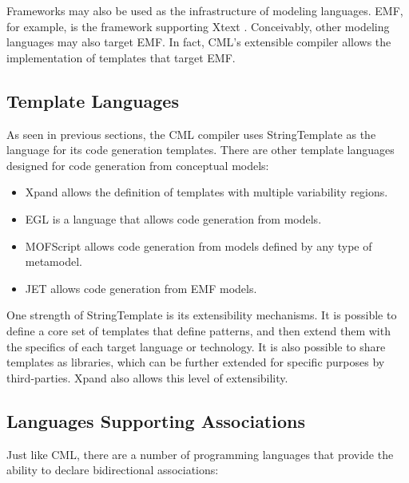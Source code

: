 Frameworks may also be used as the infrastructure of modeling languages.
EMF, for example, is the framework supporting Xtext \cite{xtext}.
Conceivably, other modeling languages may also target EMF.
In fact, CML's extensible compiler allows the implementation of templates that target EMF.

\subsection{Template Languages}

As seen in previous sections,
the CML compiler uses StringTemplate as the language for its code generation templates.
There are other template languages designed for code generation from conceptual models:

\begin{itemize}

\item Xpand \cite{xpand} allows the definition of templates with multiple variability regions.

\item EGL \cite{egl} is a language that allows code generation from models.

\item MOFScript \cite{mofscript} allows code generation from models defined
by any type of metamodel.

\item JET \cite{jet} allows code generation from EMF \cite{emf} models.

\end{itemize}

One strength of StringTemplate is its extensibility mechanisms.
It is possible to define a core set of templates that define patterns, 
and then extend them with the specifics of each target language or technology.
It is also possible to share templates as libraries,
which can be further extended for specific purposes by third-parties.
Xpand also allows this level of extensibility.

\subsection{Languages Supporting Associations}

Just like CML,
there are a number of programming languages that provide the ability to declare bidirectional associations:

